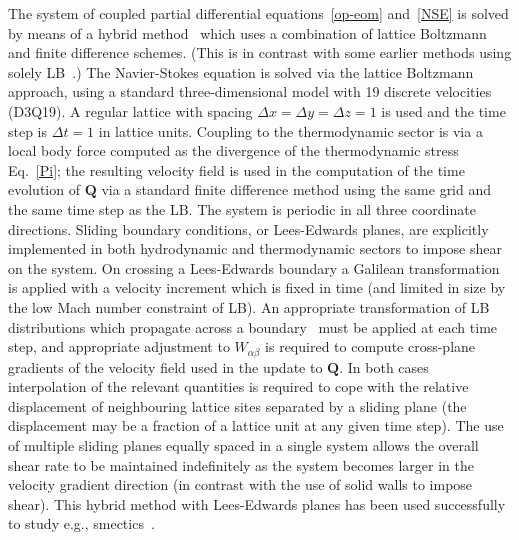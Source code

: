 \documentclass[8.5pt,twoside,twocolumn]{article}
\begin{document}
\fi

The system of coupled partial differential equations~\ref{op-eom}
and~\ref{NSE} is solved by means of a hybrid method~\cite{Marenduzzo:2007}
which uses a combination of lattice Boltzmann and finite difference schemes.
(This is in contrast with some earlier methods using solely
LB~\cite{Denniston:2001, Denniston:2004}.)
The Navier-Stokes
equation is solved via the lattice Boltzmann approach, using a standard
three-dimensional model with 19 discrete velocities (D3Q19).
A regular lattice with spacing $\Delta x = \Delta y = \Delta z = 1$ is
used and the time step is $\Delta t = 1$ in lattice units.
Coupling to the thermodynamic sector is via a
local body force computed as the divergence of the thermodynamic
stress Eq.~\ref{Pi}; the resulting velocity field is used in the computation
of the time evolution of $\mathbf{Q}$ via a standard finite difference
method using the same grid and the same time step as the LB. The system
is periodic in all three coordinate directions. Sliding
boundary conditions, or Lees-Edwards planes, are explicitly implemented
in both hydrodynamic and thermodynamic sectors to impose shear on the
system. On
crossing a Lees-Edwards boundary a Galilean transformation is applied
with a velocity increment which is fixed in time (and limited in size by the
low Mach number constraint of LB). An appropriate transformation
of LB distributions which propagate across a boundary~\cite{Wagner:2002}
must be applied at each time step, and appropriate
adjustment to $W_{\alpha\beta}$ is required to compute cross-plane
gradients of the velocity field used in the update to ${\mathbf Q}$.
In both cases interpolation of the
relevant quantities is required to cope with the relative displacement
of neighbouring lattice sites separated by a sliding plane (the
displacement may be a fraction of a lattice unit at any given time
step). The use of multiple sliding planes equally spaced in a single
system allows
the overall shear rate to be maintained indefinitely as the system
becomes larger
in the velocity gradient direction (in contrast with the use of solid
walls to impose shear). This hybrid method with Lees-Edwards planes
has been used successfully to study e.g., smectics~\cite{Henrich:2012a}.
\end{document}
